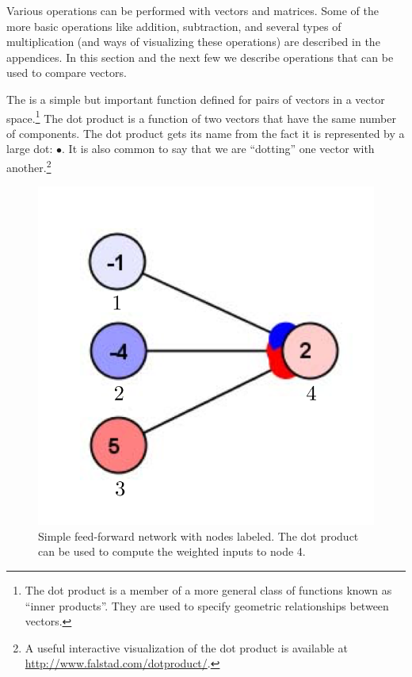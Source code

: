 Various operations can be performed with vectors and matrices. Some of the more basic operations like addition, subtraction, and several types of multiplication (and ways of visualizing these operations) are described in the appendices. In this section and the next few we describe operations that can be used to compare vectors.

   The  is a simple but important function defined for 
pairs of vectors in a vector space.\footnote{The dot product is a member 
of a more general class of functions known as ``inner products''. They are 
used to specify geometric relationships between vectors.}  The dot product is a function of two 
vectors that have the same 
number of components. The dot product gets its name from the fact it is represented by 
a large dot: $\bullet$. It is also common to say that we are ``dotting'' one 
vector with another.\footnote{A useful interactive visualization of the dot 
product is available at \url{http://www.falstad.com/dotproduct/}.}
\begin{figure}[h]
\centering
\includegraphics[scale=.7]{./images/Simple3Labelled.png}
\caption[Simbrain screenshot.]{Simple feed-forward network with nodes labeled. 
The dot product can be used to compute the weighted inputs to node 4.} 
\label{F:simplelabelled}
\end{figure}

